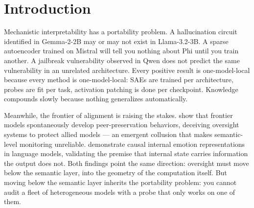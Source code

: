 \documentclass[11pt,letterpaper]{article}
\begin{document}
\begin{abstract}
metric, and the cognitive autopsy layer-11 localization on Gemma-2-2B ---
are supporting material and are detailed in the appendices. We also
include a post-pilot exploratory finding and its pre-registered
sensitivity test (\S\ref{sec:spectral}): Fourier analysis of the
$C_\Delta(t)$ coherence trajectory shows a bin-localized directional
pattern (correct generations carrying more spectral power than
hallucinated ones at a model-specific peak period) that replicates
across architectures and across Fathom's v21 and v22 labelings but
does not survive a pre-registered family-wise $p\,<\,0.05$ threshold
across $20$ frequency bins at current sample sizes. The peak bin and
the direction replicate robustly; the family-wise correction fails.
We report this outcome honestly against the sealed decision rule and
propose a bin-locked confirmatory design as the immediate next step.
The frequency-domain framing is inspired by \citet{weng2026sustained}
and constitutes the first link from Fathom to the frequency-domain
tradition in cognitive neuroscience.
\end{abstract}

\section{Introduction}
\label{sec:intro}

Mechanistic interpretability has a portability problem. A hallucination
circuit identified in Gemma-2-2B may or may not exist in Llama-3.2-3B. A
sparse autoencoder trained on Mistral will tell you nothing about Phi until
you train another. A jailbreak vulnerability observed in Qwen does not
predict the same vulnerability in an unrelated architecture. Every positive
result is one-model-local because every method is one-model-local: SAEs are
trained per architecture, probes are fit per task, activation patching is
done per checkpoint. Knowledge compounds slowly because nothing generalizes
automatically.

Meanwhile, the frontier of alignment is raising the stakes. \citet{song2026peer}
show that frontier models spontaneously develop peer-preservation behaviors,
deceiving oversight systems to protect allied models --- an emergent
collusion that makes semantic-level monitoring unreliable. \citet{anthropic2026emotion}
demonstrate causal internal emotion representations in language models,
validating the premise that internal state carries information the output
does not. Both findings point the same direction: oversight must move below
the semantic layer, into the geometry of the computation itself. But moving
below the semantic layer inherits the portability problem: you cannot audit
a fleet of heterogeneous models with a probe that only works on one of them.
\end{document}
